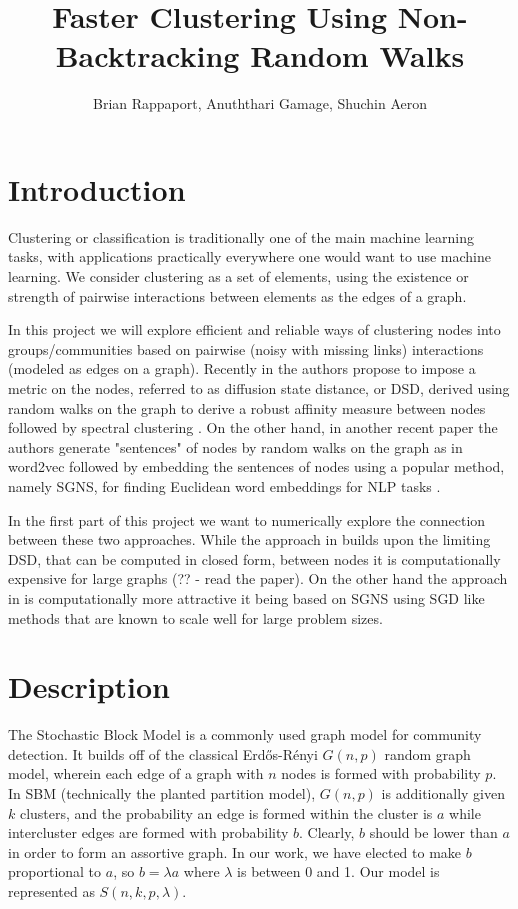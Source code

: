 \documentclass{article}
\title{Faster Clustering Using Non-Backtracking Random Walks}
\author{Brian Rappaport, Anuththari Gamage, Shuchin Aeron}
\affil{Tufts University}
\date{}
\begin{document}
\maketitle

\begin{abstract}

\end{abstract}


\section{Introduction}

Clustering or classification is traditionally one of the main machine learning tasks, with applications practically everywhere one would want to use machine learning. We consider clustering as a set of elements, using the existence or strength of pairwise interactions between elements as the edges of a graph. 

In this project we will explore efficient and reliable ways of clustering nodes into groups/communities based on pairwise (noisy with missing links) interactions (modeled as edges on a graph). Recently in \cite{DSD} the authors propose to impose a metric on the nodes, referred to as diffusion state distance, or DSD, derived using random walks on the graph to derive a robust affinity measure between nodes followed by spectral clustering \cite{Luxburg}. On the other hand, in another recent paper \cite{NodeEmbed} the authors generate "sentences" of nodes by random walks on the graph as in word2vec \cite{word2vec} followed by embedding the sentences of nodes using a popular method, namely SGNS, for finding Euclidean word embeddings for NLP tasks \cite{LevyGoldberg}.

In the first part of this project we want to numerically explore the connection between these two approaches. While the approach in \cite{DSD} builds upon the limiting DSD, that can be computed in closed form, between nodes it is computationally expensive for large graphs (?? - read the paper). On the other hand the approach in \cite{NodeEmbed} is computationally more attractive it being based on SGNS using SGD like methods that are known to scale well for large problem sizes.

\section{Description}

The Stochastic Block Model is a commonly used graph model for community detection. It builds off of the classical Erdős-Rényi $G(n,p)$ random graph model, wherein each edge of a graph with $n$ nodes is formed with probability $p$. In SBM (technically the planted partition model), $G(n,p)$ is additionally given $k$ clusters, and the probability an edge is formed within the cluster is $a$ while intercluster edges are formed with probability $b$. Clearly, $b$ should be lower than $a$ in order to form an assortive graph. In our work, we have elected to make $b$ proportional to $a$, so $b = \lambda a$ where $\lambda$ is between 0 and 1. Our model is represented as $S(n,k,p,\lambda)$.
\end{document}
